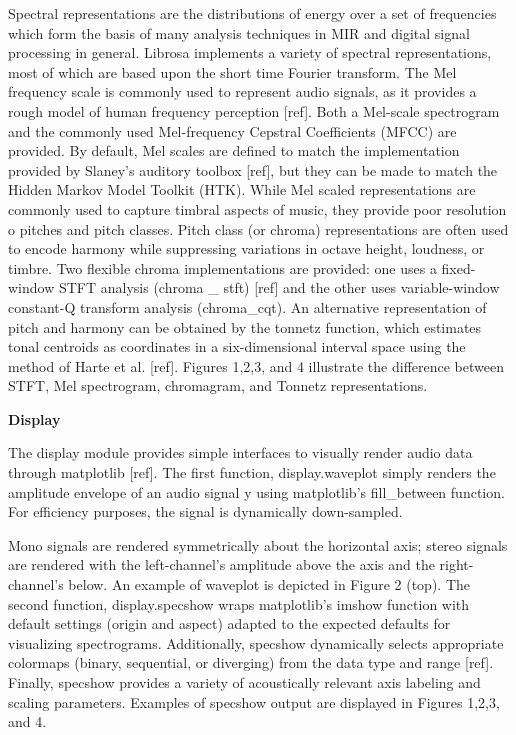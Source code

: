 Spectral representations are the distributions of energy over a set of frequencies which form the basis of many analysis techniques in MIR and digital signal processing in general. Librosa implements a variety of spectral representations, most of which are based upon the short \space time Fourier transform. The Mel frequency scale is commonly used to represent audio signals, as it provides a rough model of human frequency perception [ref]. Both a Mel-scale spectrogram and the commonly used Mel-frequency Cepstral Coefficients (MFCC) are provided. By default, Mel scales are defined to match the implementation provided by Slaney’s auditory toolbox [ref], but they can be made to match the Hidden Markov Model Toolkit (HTK). While Mel \space scaled representations are commonly used to capture timbral aspects of music, they provide poor resolution o pitches and pitch classes. Pitch class (or chroma) representations are often used to encode harmony while suppressing variations in octave height, loudness, or timbre. Two flexible chroma implementations are provided: one uses a fixed-window STFT analysis (chroma \_ stft) [ref] and the other uses variable-window constant-Q transform analysis (chroma\_cqt). An alternative representation of pitch and harmony can be obtained by the tonnetz function, which estimates tonal centroids as coordinates in a six-dimensional interval space using the method of Harte et \space al. [ref]. Figures 1,2,3, and 4 illustrate the difference between STFT, Mel spectrogram, chromagram, and Tonnetz representations.

\begin{flushleft}
  \textbf{Display}
\end{flushleft}

The display module provides simple interfaces to visually render audio data through matplotlib [ref]. The first function, display.waveplot simply renders the amplitude envelope of an audio signal y using matplotlib’s fill\_between function. For efficiency purposes, the signal is dynamically down-sampled.
\par
Mono signals are rendered symmetrically about the horizontal axis; stereo signals are rendered with the left-channel’s amplitude above the axis and the right-channel’s below. An example of waveplot is depicted in Figure 2 (top). The second function, display.specshow wraps matplotlib’s imshow function with default settings (origin and aspect) adapted to the expected defaults for visualizing spectrograms. Additionally, specshow dynamically selects appropriate colormaps (binary, sequential, or diverging) from the data type and range [ref]. Finally, specshow provides a variety of acoustically relevant axis labeling and scaling parameters. Examples of specshow output are displayed in Figures 1,2,3, and 4.

